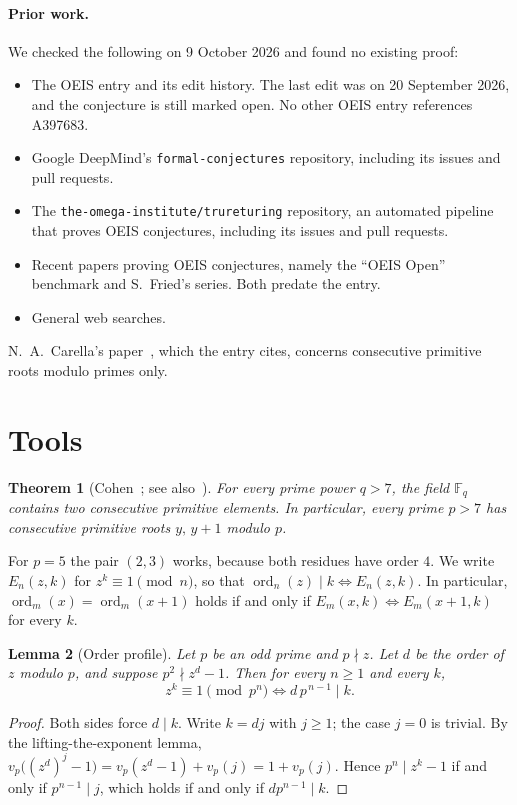 \documentclass[11pt]{article}
\newtheorem{theorem}{Theorem}
\newtheorem{lemma}[theorem]{Lemma}
\theoremstyle{remark}
\newcommand{\ord}{\operatorname{ord}}
\begin{document}
\paragraph{Prior work.} We checked the following on 9 October 2026 and found no existing proof:
\begin{itemize}
  \item The OEIS entry and its edit history. The last edit was on 20 September 2026, and the
    conjecture is still marked open. No other OEIS entry references A397683.
  \item Google DeepMind's \texttt{formal-conjectures} repository, including its issues and pull
    requests.
  \item The \texttt{the-omega-institute/trureturing} repository, an automated pipeline that
    proves OEIS conjectures, including its issues and pull requests.
  \item Recent papers proving OEIS conjectures, namely the ``OEIS Open'' benchmark and S.~Fried's
    series. Both predate the entry.
  \item General web searches.
\end{itemize}
N.~A.~Carella's paper~\cite{carella}, which the entry cites, concerns consecutive primitive
roots modulo primes only.

\section{Tools}

\begin{theorem}[Cohen~\cite{cohen1,cohen2}; see also~\cite{cot}]\label{thm:cohen}
For every prime power $q>7$, the field $\mathbb F_q$ contains two consecutive primitive
elements. In particular, every prime $p>7$ has consecutive primitive roots $y,\,y+1$ modulo
$p$.
\end{theorem}

For $p=5$ the pair $(2,3)$ works, because both residues have order $4$. We write $E_n(z,k)$
for $z^k\equiv 1\pmod n$, so that $\ord_n(z)\mid k\iff E_n(z,k)$. In particular,
$\ord_m(x)=\ord_m(x+1)$ holds if and only if $E_m(x,k)\iff E_m(x+1,k)$ for every $k$.

\begin{lemma}[Order profile]\label{lem:profile}
Let $p$ be an odd prime and $p\nmid z$. Let $d$ be the order of $z$ modulo $p$, and suppose
$p^2\nmid z^d-1$. Then for every $n\ge 1$ and every $k$,
\[ z^k\equiv 1 \pmod{p^n}\iff d\,p^{\,n-1}\mid k. \]
\end{lemma}
\begin{proof}
Both sides force $d\mid k$. Write $k=dj$ with $j\ge1$; the case $j=0$ is trivial. By the
lifting-the-exponent lemma,
$v_p\bigl((z^d)^j-1\bigr)=v_p(z^d-1)+v_p(j)=1+v_p(j)$. Hence $p^n\mid z^k-1$ if and only if
$p^{n-1}\mid j$, which holds if and only if $dp^{n-1}\mid k$.
\end{proof}
\end{document}
